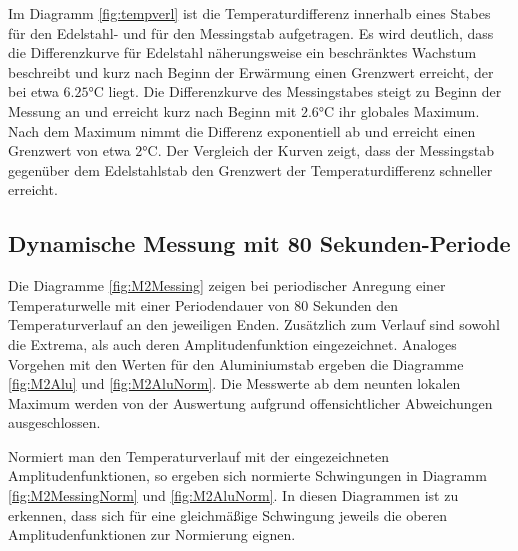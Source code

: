 Im Diagramm \ref{fig:tempverl} ist die Temperaturdifferenz innerhalb eines Stabes für den Edelstahl- und für den Messingstab aufgetragen. 
Es wird deutlich, dass die Differenzkurve für Edelstahl näherungsweise ein beschränktes Wachstum beschreibt und kurz nach Beginn der Erwärmung einen Grenzwert erreicht, der bei etwa  $6.25 \si{\degreeCelsius}$ liegt.
Die Differenzkurve des Messingstabes steigt zu Beginn der Messung an und erreicht kurz nach Beginn mit $2.6 \si{\degreeCelsius}$ ihr globales Maximum. 
Nach dem Maximum nimmt die Differenz exponentiell ab und erreicht einen Grenzwert von etwa $2 \si{\degreeCelsius}$.
Der Vergleich der Kurven zeigt, dass der Messingstab gegenüber dem Edelstahlstab den Grenzwert der Temperaturdifferenz schneller erreicht.

\subsection{Dynamische Messung mit 80 Sekunden-Periode}
Die Diagramme \ref{fig:M2Messing} zeigen bei periodischer Anregung einer Temperaturwelle mit einer Periodendauer von 80 Sekunden den Temperaturverlauf an den jeweiligen Enden. 
Zusätzlich zum Verlauf sind sowohl die Extrema, als auch deren Amplitudenfunktion eingezeichnet. 
Analoges Vorgehen mit den Werten für den Aluminiumstab ergeben die Diagramme \ref{fig:M2Alu} und \ref{fig:M2AluNorm}.
Die Messwerte ab dem neunten lokalen Maximum werden von der Auswertung aufgrund offensichtlicher Abweichungen ausgeschlossen.

Normiert man den Temperaturverlauf mit der eingezeichneten Amplitudenfunktionen, so ergeben sich normierte Schwingungen in Diagramm \ref{fig:M2MessingNorm} und \ref{fig:M2AluNorm}. In diesen Diagrammen ist zu erkennen, dass sich für eine gleichmäßige Schwingung jeweils die oberen Amplitudenfunktionen zur Normierung eignen.

